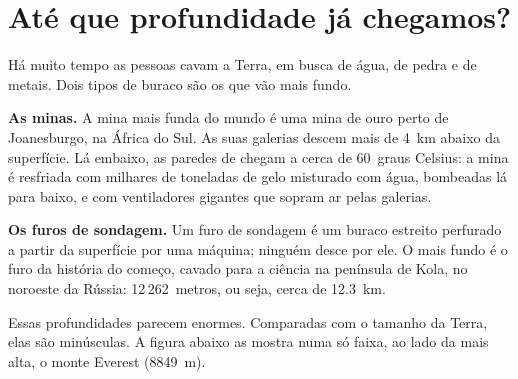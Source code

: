 \section{Até que profundidade já chegamos?}

Há muito tempo as pessoas cavam a Terra, em busca de água, de pedra e de
metais. Dois tipos de buraco são os que vão mais fundo.

\textbf{As minas.} A mina mais funda do mundo é uma mina de ouro perto de
Joanesburgo, na África do Sul. As suas galerias descem mais de 4~km abaixo
da superfície. Lá embaixo, as paredes de  chegam a cerca de
60~graus Celsius: a mina é resfriada com milhares de toneladas de gelo
misturado com água, bombeadas lá para baixo, e com ventiladores gigantes
que sopram ar pelas galerias.

\textbf{Os furos de sondagem.} Um furo de sondagem é um buraco estreito
perfurado a partir da superfície por uma máquina; ninguém desce por ele. O
mais fundo é o furo da história do começo, cavado para a ciência na
península de Kola, no noroeste da Rússia: 12\,262~metros, ou seja, cerca de
12.3~km.

Essas profundidades parecem enormes. Comparadas com o tamanho da Terra,
elas são minúsculas. A figura abaixo as mostra numa só faixa, ao lado da
 mais alta, o monte Everest (8849~m).

